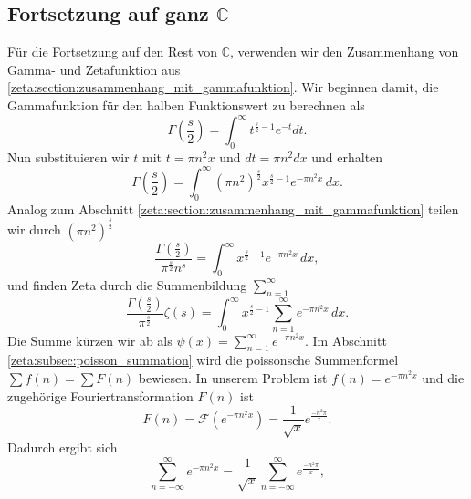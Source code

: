 \subsection{Fortsetzung auf ganz $\mathbb{C}$} \label{zeta:subsection:auf_ganz}
Für die Fortsetzung auf den Rest von $\mathbb{C}$, verwenden wir den Zusammenhang von Gamma- und Zetafunktion aus \ref{zeta:section:zusammenhang_mit_gammafunktion}.
Wir beginnen damit, die Gammafunktion für den halben Funktionswert zu berechnen als
\begin{equation}
    \Gamma \left( \frac{s}{2} \right)
    =
    \int_0^{\infty} t^{\frac{s}{2}-1} e^{-t} dt.
\end{equation}
Nun substituieren wir $t$ mit $t = \pi n^2 x$ und $dt=\pi n^2 dx$ und erhalten
\begin{equation}
    \Gamma \left( \frac{s}{2} \right)
    =
    \int_0^{\infty}
    (\pi n^2)^{\frac{s}{2}}
    x^{\frac{s}{2}-1}
    e^{-\pi n^2 x}
    \,dx.
\end{equation}
Analog zum Abschnitt \ref{zeta:section:zusammenhang_mit_gammafunktion} teilen wir durch $(\pi n^2)^{\frac{s}{2}}$
\begin{equation}
    \frac{\Gamma \left( \frac{s}{2} \right)}{\pi^{\frac{s}{2}} n^s}
     =
    \int_0^{\infty}
    x^{\frac{s}{2}-1}
    e^{-\pi n^2 x}
    \,dx,
\end{equation}
und finden Zeta durch die Summenbildung $\sum_{n=1}^{\infty}$
\begin{equation}
    \frac{\Gamma \left( \frac{s}{2} \right)}{\pi^{\frac{s}{2}}}
    \zeta(s)
    =
    \int_0^{\infty}
    x^{\frac{s}{2}-1}
    \sum_{n=1}^{\infty}
    e^{-\pi n^2 x}
    \,dx. \label{zeta:equation:integral1}
\end{equation}
Die Summe kürzen wir ab als $\psi(x) = \sum_{n=1}^{\infty} e^{-\pi n^2 x}$.
Im Abschnitt \ref{zeta:subsec:poisson_summation} wird die poissonsche Summenformel $\sum f(n) = \sum F(n)$ bewiesen.
In unserem Problem ist $f(n) =  e^{-\pi n^2 x}$ und die zugehörige Fouriertransformation $F(n)$ ist
\begin{equation}
    F(n)
    =
    \mathcal{F}
    (
    e^{-\pi n^2 x}
    )
    =
    \frac{1}{\sqrt{x}}
    e^{\frac{-n^2 \pi}{x}}.
\end{equation}
Dadurch ergibt sich
\begin{equation}\label{zeta:equation:psi}
    \sum_{n=-\infty}^{\infty}
    e^{-\pi n^2 x}
    =
    \frac{1}{\sqrt{x}}
    \sum_{n=-\infty}^{\infty}
    e^{\frac{-n^2 \pi}{x}},
\end{equation}
